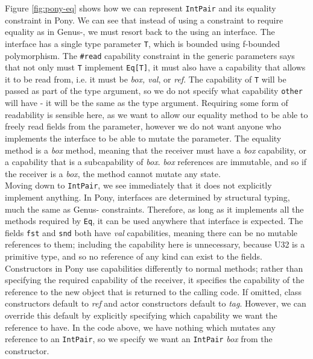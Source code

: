 Figure \ref{fig:pony-eq} shows how we can represent \texttt{IntPair} and its equality constraint in Pony. We can see that instead of using a constraint to require equality as in Genus-, we must resort back to the using an interface. The interface has a single type parameter \texttt{T}, which is bounded using f-bounded polymorphism. The \texttt{\#read} capability constraint in the generic parameters says that not only must \texttt{T} implement \texttt{Eq[T]}, it must also have a capability that allows it to be read from, i.e. it must be \textit{box, val}, or \textit{ref}. The capability of \texttt{T} will be passed as part of the type argument, so we do not specify what capability \texttt{other} will have - it will be the same as the type argument. Requiring some form of readability is sensible here, as we want to allow our equality method to be able to freely read fields from the parameter, however we do not want anyone who implements the interface to be able to mutate the parameter. The equality method is a \textit{box} method, meaning that the receiver must have a \textit{box} capability, or a capability that is a subcapability of \textit{box}. \textit{box} references are immutable, and so if the receiver is a \textit{box}, the method cannot mutate any state. \\

Moving down to \texttt{IntPair}, we see immediately that it does not explicitly implement anything. In Pony, interfaces are determined by structural typing, much the same as Genus- constraints. Therefore, as long as it implements all the methods required by \texttt{Eq}, it can be used anywhere that interface is expected. The fields \texttt{fst} and \texttt{snd} both have \textit{val} capabilities, meaning there can be no mutable references to them; including the capability here is unnecessary, because U32 is a primitive type, and so no reference of any kind can exist to the fields. \\

Constructors in Pony use capabilities differently to normal methods; rather than specifying the required capability of the receiver, it specifies the capability of the reference to the new object that is returned to the calling code. If omitted, class constructors default to \textit{ref} and actor constructors default to \textit{tag}. However, we can override this default by explicitly specifying which capability we want the reference to have. In the code above, we have nothing which mutates any reference to an \texttt{IntPair}, so we specify we want an \texttt{IntPair} \textit{box} from the constructor. \\

